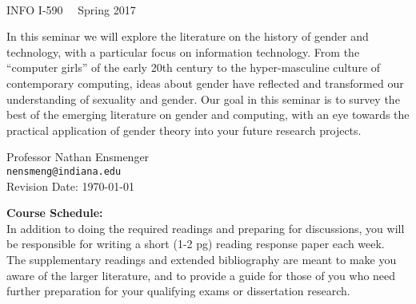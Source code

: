 \documentclass[11pt]{article}
\begin{document}
\thispagestyle{empty}
	
\begin{center}	
	
  \fontsize{28pt}{32pt} \selectfont {Technology \& Gender} \\
  \Large{INFO I-590 \textbullet \ \ Spring 2017}\\

\vspace{0.2in}

\setlength{\fboxsep}{0mm} %
\setlength{\fboxrule}{2pt}

\end{center}
 
\vspace{0.2in}

In this seminar we will explore the literature on the history of gender and technology, with a particular focus on information technology.  From the ``computer girls'' of the early 20th century to the hyper-masculine culture of contemporary computing, ideas about gender have reflected and transformed our understanding of sexuality and gender.  Our goal in this seminar is to survey the best of the emerging literature on gender and computing, with an eye towards the practical application of gender theory into your future research projects.


\vspace{0.1in}

\begin{center} 
 Professor Nathan Ensmenger\\ \texttt{nensmeng@indiana.edu}\\
\vspace{0.1in}
Revision Date: \today
\end{center}

\vspace{0.3in}

\newpage


\newpage
\large{\textbf{Course Schedule:}}\\


\noindent In addition to doing the required readings and preparing for discussions, you will be responsible for writing a short (1-2 pg) reading response paper each week.\\

\noindent The supplementary readings and extended bibliography are meant to make you aware of the larger literature, and to provide a guide for those of you who need further preparation for your qualifying exams or dissertation research.\\
\end{document}
